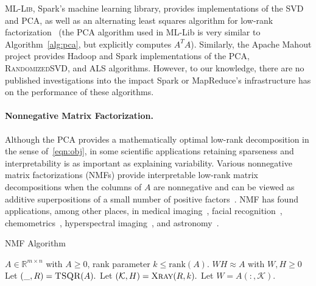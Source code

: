 \textsc{ML-Lib}, Spark's machine learning library, provides implementations of the SVD and PCA, as well as an alternating least squares algorithm for low-rank factorization~\cite{meng2015mllib} (the PCA algorithm used in ML-Lib is very similar to Algorithm~\ref{alg:pca}, but explicitly computes $A^TA$). Similarly, the Apache Mahout project provides Hadoop and Spark implementations of the PCA, \textsc{RandomizedSVD}, and ALS algorithms. However, to our knowledge, there are no published investigations into the impact Spark or MapReduce's infrastructure has on the performance of these algorithms.
  
\paragraph{Nonnegative Matrix Factorization.}
Although the PCA provides a mathematically optimal low-rank decomposition in the sense of~\eqref{eqn:obj}, in some scientific applications retaining sparseness and interpretability is as important as explaining variability. 
Various nonnegative matrix factorizations (NMFs) provide interpretable low-rank matrix decompositions when the columns of $A$ are nonnegative and can be viewed as additive superpositions of a small number of positive factors~\cite{gillis2014and}. NMF has found applications, among other places, in medical imaging~\cite{lee2001nmf}, facial recognition~\cite{guillamet2002non}, chemometrics~\cite{Paatero199723}, hyperspectral imaging~\cite{gillis2015hierarchical}, and astronomy~\cite{pauca2006nonnegative}.

\begin{algorithm}[tb]
    \caption{\textsc{NMF} Algorithm}
    \label{alg:nmf}
    \begin{algorithmic}[1]
      \Require $A \in \mathbb{R}^{m\times n}$ with $A \geq 0$, rank parameter $k \leq \textrm{rank}(A).$
      \Ensure $W H \approx A$ with $W,H \geq 0$
      \State Let $(\_, R) = \textsc{TSQR}(A).$
      \State Let $(\mathcal{K}, H) = \textsc{Xray}(R, k).$
      \State Let $W = A(:, \mathcal{K}).$
    \end{algorithmic}
  \end{algorithm}
  
